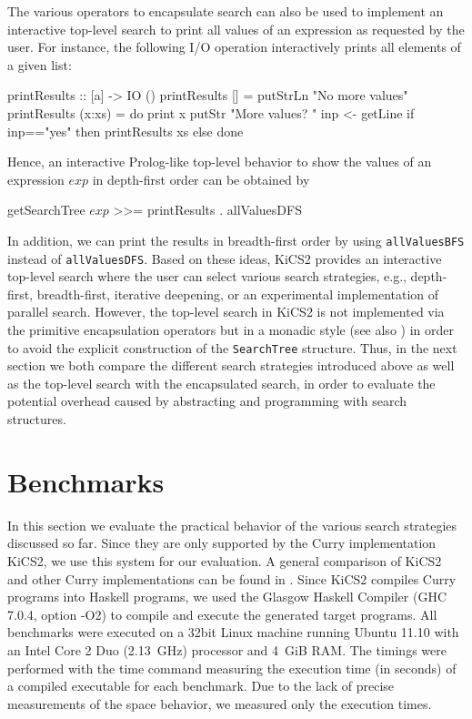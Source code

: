 \documentclass[english]{lni}
\newcommand{\code}[1]{\texttt{\small{}#1}}
\begin{document}
The various operators to encapsulate search can also
be used to implement an interactive top-level search
to print all values of an expression as requested by the user.
For instance, the following I/O operation interactively 
prints all elements of a given list:
%
\begin{curry}
printResults :: [a] -> IO ()
printResults []     = putStrLn "No more values"
printResults (x:xs) = do print x
                         putStr "More values? "
                         inp <- getLine
                         if inp=="yes" then printResults xs
                                       else done
\end{curry}
%
Hence, an interactive Prolog-like top-level behavior
to show the values of an expression $exp$ in depth-first order
can be obtained by
\begin{curry}
getSearchTree $exp$ >>= printResults . allValuesDFS
\end{curry}
In addition, we can print the results in breadth-first order
by using \code{allValuesBFS} instead of \code{allValuesDFS}.
Based on these ideas, KiCS2 provides an interactive top-level search
where the user can select various search strategies,
e.g., depth-first, breadth-first, iterative deepening, or
an experimental implementation of parallel search.
However, the top-level search in KiCS2 is not implemented
via the primitive encapsulation operators but in
a monadic style (see also \cite{BrasselHanusPeemoellerReck11})
in order to avoid the explicit construction
of the \code{SearchTree} structure.
Thus, in the next section we both compare the different search strategies
introduced above as well as the top-level search
with the encapsulated search, in order to evaluate the potential overhead
caused by abstracting and programming with search structures.


\section{Benchmarks}
\label{sec:benchmarks}

In this section we evaluate the practical behavior
of the various search strategies discussed so far.
Since they are only supported by the Curry implementation KiCS2,
we use this system for our evaluation.
A general comparison of KiCS2 and other Curry implementations
can be found in \cite{BrasselHanusPeemoellerReck11}.
Since KiCS2 compiles Curry programs into Haskell programs,
we used the Glasgow Haskell Compiler
(GHC 7.0.4, option -O2) to compile and execute
the generated target programs.
All benchmarks were executed on a 32bit Linux machine
running Ubuntu 11.10 with an Intel Core 2 Duo (2.13~GHz) processor and 4~GiB RAM.
The timings were performed with the time command measuring the
execution time (in seconds) of a compiled executable for each benchmark.
Due to the lack of precise measurements of the space behavior,
we measured only the execution times.
\end{document}
